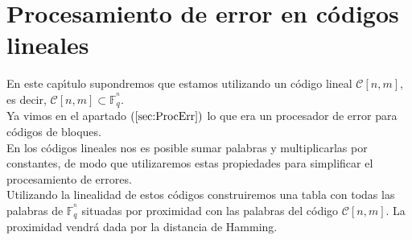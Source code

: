 %
%

\chapter{Procesamiento de error en c\'odigos lineales}\label{cap:PError}

En este cap\'{\i}tulo supondremos que estamos utilizando un c\'odigo lineal
$\mathcal{C}[n,m]$, es decir, $\mathcal{C}[n,m]\subset \mathbb{F}^{^n}_q$.\\

Ya vimos en el apartado $(\ref{sec:ProcErr})$ lo que era un procesador de error
para c\'odigos de bloques.\\

En los c\'odigos lineales nos es posible sumar palabras y multiplicarlas por
constantes, de modo que utilizaremos estas propiedades para simplificar el
procesamiento de errores. \\

Utilizando la linealidad de estos c\'odigos construiremos una tabla con todas
las palabras de $\mathbb{F}^{^n}_q$ situadas por proximidad con las palabras
del c\'odigo $\mathcal{C}[n,m]$. La proximidad vendr\'a dada por la distancia
de Hamming.

% 
%



%
%



%
%



%
%



%
%



%
%



%
%



%
%



%
%


